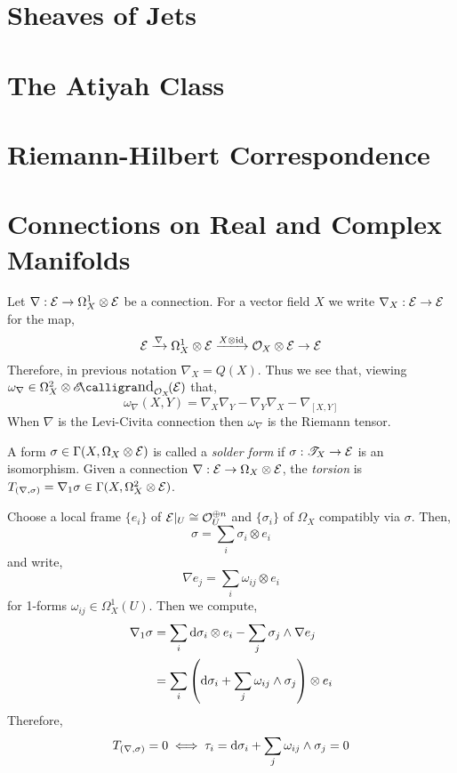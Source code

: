 \documentclass[12pt]{article}
\begin{document}
\section{Sheaves of Jets}

\section{The Atiyah Class}

\section{Riemann-Hilbert Correspondence}



\section{Connections on Real and Complex Manifolds}

\begin{rmk}
Let $\nabla : \mathcal{E} \to \Omega^1_X \otimes \mathcal{E}$ be a connection. For a vector field $X$ we write $\nabla_X : \mathcal{E} \to \mathcal{E}$ for the map,
\[ \mathcal{E} \xrightarrow{\nabla} \Omega^1_X \otimes \mathcal{E} \xrightarrow{X \otimes \mathrm{id}} \mathcal{O}_{X} \otimes \mathcal{E} \to \mathcal{E} \]
Therefore, in previous notation $\nabla_X = Q(X)$. Thus we see that, viewing $\omega_\nabla \in \Omega^2_X \otimes \shEnd{\struct{X}}{\E}$ that,
\[ \omega_\nabla(X, Y) = \nabla_X \nabla_Y - \nabla_Y \nabla_X - \nabla_{[X, Y]} \]
When $\nabla$ is the Levi-Civita connection then $\omega_\nabla$ is the Riemann tensor.
\end{rmk}

\begin{defn}
A form $\sigma \in \Gamma(X, \Omega_X \otimes \mathcal{E})$ is called a \textit{solder form} if $\sigma : \mathscr{T}_X \to \mathcal{E}$ is an isomorphism. Given a connection $\nabla : \mathcal{E} \to \Omega_X \otimes \mathcal{E}$, the \textit{torsion} is $T_{(\nabla, \sigma)} = \nabla_1 \sigma \in \Gamma(X, \Omega_X^2 \otimes \mathcal{E})$.
\end{defn}

\begin{rmk}
Choose a local frame $\{ e_i \}$ of $\mathcal{E}|_U \cong \mathcal{O}_{U}^{\oplus n}$ and $\{ \sigma_i \}$ of $\Omega_X$ compatibly via $\sigma$. Then,
\[ \sigma = \sum_{i} \sigma_i \otimes e_i \]
and write,
\[ \nabla e_j = \sum_i \omega_{ij} \otimes e_i \]
for 1-forms $\omega_{ij} \in \Omega^1_X(U)$.
Then we compute,
\begin{align*}
\nabla_1 \sigma & = \sum_i \mathrm{d}{\sigma_i} \otimes e_i - \sum_j \sigma_j \wedge \nabla e_j
\\
& = \sum_{i} \left( \mathrm{d}{\sigma_i} + \sum_j \omega_{ij} \wedge \sigma_j \right) \otimes e_i 
\end{align*}
Therefore,
\[ T_{(\nabla, \sigma)} = 0 \iff \tau_i = \mathrm{d}{\sigma_i} + \sum_j \omega_{ij} \wedge \sigma_j = 0 \]
\end{rmk}
\end{document}
